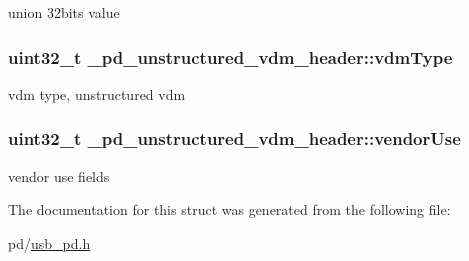 union 32bits value \hypertarget{struct__pd__unstructured__vdm__header_a09d6bd908ac54c019051d53e2b12ab11}{
\subsubsection[{vdm\-Type}]{\setlength{\rightskip}{0pt plus 5cm}uint32\-\_\-t \-\_\-pd\-\_\-unstructured\-\_\-vdm\-\_\-header\-::vdm\-Type}}\label{struct__pd__unstructured__vdm__header_a09d6bd908ac54c019051d53e2b12ab11}
vdm type, unstructured vdm \hypertarget{struct__pd__unstructured__vdm__header_a2375bdcd908496f368cb35324d43912d}{
\subsubsection[{vendor\-Use}]{\setlength{\rightskip}{0pt plus 5cm}uint32\-\_\-t \-\_\-pd\-\_\-unstructured\-\_\-vdm\-\_\-header\-::vendor\-Use}}\label{struct__pd__unstructured__vdm__header_a2375bdcd908496f368cb35324d43912d}
vendor use fields 

The documentation for this struct was generated from the following file\-:\begin{DoxyCompactItemize}
\item 
pd/\hyperlink{usb__pd_8h}{usb\-\_\-pd.\-h}\end{DoxyCompactItemize}
